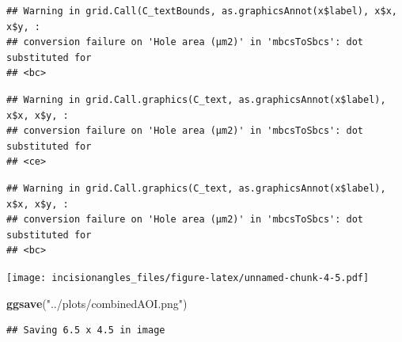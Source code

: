 \documentclass[
]{article}
\newenvironment{Shaded}{\begin{snugshade}}{\end{snugshade}}
\newcommand{\FunctionTok}[1]{\textcolor[rgb]{0.13,0.29,0.53}{\textbf{#1}}}
\newcommand{\NormalTok}[1]{#1}
\newcommand{\StringTok}[1]{\textcolor[rgb]{0.31,0.60,0.02}{#1}}
\begin{document}
\begin{verbatim}
## Warning in grid.Call(C_textBounds, as.graphicsAnnot(x$label), x$x, x$y, :
## conversion failure on 'Hole area (μm2)' in 'mbcsToSbcs': dot substituted for
## <bc>
\end{verbatim}

\begin{verbatim}
## Warning in grid.Call.graphics(C_text, as.graphicsAnnot(x$label), x$x, x$y, :
## conversion failure on 'Hole area (μm2)' in 'mbcsToSbcs': dot substituted for
## <ce>
\end{verbatim}

\begin{verbatim}
## Warning in grid.Call.graphics(C_text, as.graphicsAnnot(x$label), x$x, x$y, :
## conversion failure on 'Hole area (μm2)' in 'mbcsToSbcs': dot substituted for
## <bc>
\end{verbatim}

\texttt{[image: incisionangles\_files/figure-latex/unnamed-chunk-4-5.pdf]}

\begin{Shaded}
\begin{Highlighting}[]
\FunctionTok{ggsave}\NormalTok{(}\StringTok{"../plots/combinedAOI.png"}\NormalTok{)}
\end{Highlighting}
\end{Shaded}

\begin{verbatim}
## Saving 6.5 x 4.5 in image
\end{verbatim}
\end{document}
